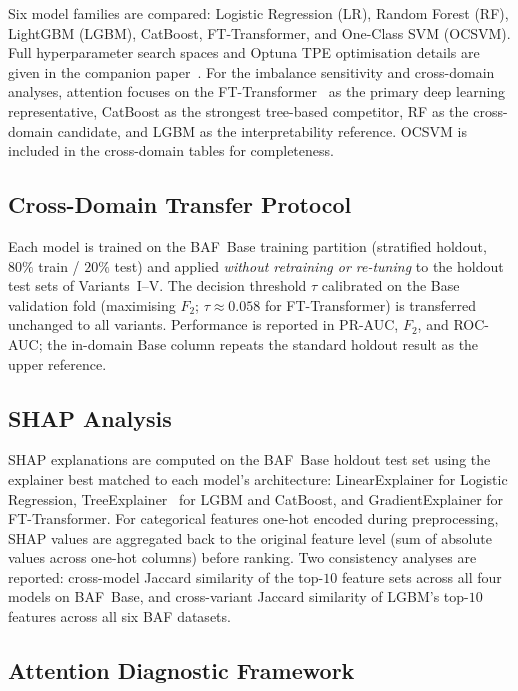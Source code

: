 \documentclass[a4paper,fleqn]{cas-sc}
\begin{document}
Six model families are compared: Logistic Regression (LR), Random Forest (RF),
LightGBM (LGBM), CatBoost, FT-Transformer, and One-Class SVM (OCSVM).
Full hyperparameter search spaces and Optuna TPE optimisation details
are given in the companion paper~\citep{caixeiro2025threshold}.
For the imbalance sensitivity and cross-domain analyses, attention focuses on
the FT-Transformer~\citep{gorishniy2021revisiting} as the primary deep learning
representative, CatBoost as the strongest tree-based competitor, RF as the
cross-domain candidate, and LGBM as the interpretability reference.
OCSVM is included in the cross-domain tables for completeness.

\subsection{Cross-Domain Transfer Protocol}

Each model is trained on the BAF~Base training partition (stratified holdout, $80\%$
train / $20\%$ test) and applied \emph{without retraining or re-tuning} to
the holdout test sets of Variants~I--V.
The decision threshold $\tau$ calibrated on the Base validation fold
(maximising $F_2$; $\tau \approx 0.058$ for FT-Transformer) is transferred
unchanged to all variants.
Performance is reported in PR-AUC, $F_2$, and ROC-AUC; the in-domain
Base column repeats the standard holdout result as the upper reference.

\subsection{SHAP Analysis}

SHAP explanations are computed on the BAF~Base holdout test set using the
explainer best matched to each model's architecture:
LinearExplainer for Logistic Regression, TreeExplainer~\citep{lundberg2020local}
for LGBM and CatBoost, and GradientExplainer for FT-Transformer.
For categorical features one-hot encoded during preprocessing, SHAP values
are aggregated back to the original feature level (sum of absolute values across
one-hot columns) before ranking.
Two consistency analyses are reported: cross-model Jaccard similarity of the
top-$10$ feature sets across all four models on BAF~Base, and cross-variant
Jaccard similarity of LGBM's top-$10$ features across all six BAF datasets.

\subsection{Attention Diagnostic Framework}
\end{document}

